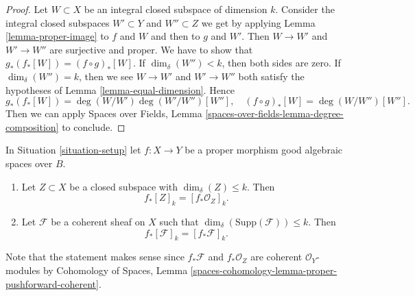 \begin{proof}
Let $W \subset X$ be an integral closed subspace of dimension $k$.
Consider the integral closed subspaces
$W' \subset Y$ and $W'' \subset Z$
we get by applying Lemma \ref{lemma-proper-image}
to $f$ and $W$ and then to $g$ and $W'$.
Then $W \to W'$ and $W' \to W''$ are surjective and proper.
We have to show that $g_*(f_*[W]) = (f \circ g)_*[W]$.
If $\dim_\delta(W'') < k$, then both sides are zero.
If $\dim_\delta(W'') = k$, then we see $W \to W'$ and $W' \to W''$
both satisfy the hypotheses of Lemma \ref{lemma-equal-dimension}.
Hence
$$
g_*(f_*[W]) = \deg(W/W')\deg(W'/W'')[W''],
\quad
(f \circ g)_*[W] = \deg(W/W'')[W''].
$$
Then we can apply
Spaces over Fields, Lemma \ref{spaces-over-fields-lemma-degree-composition}
to conclude.
\end{proof}

\begin{lemma}
\label{lemma-cycle-push-sheaf}
In Situation \ref{situation-setup} let $f : X \to Y$ be a proper morphism
good algebraic spaces over $B$.
\begin{enumerate}
\item Let $Z \subset X$ be a closed subspace with $\dim_\delta(Z) \leq k$.
Then
$$
f_*[Z]_k = [f_*{\mathcal O}_Z]_k.
$$
\item Let $\mathcal{F}$ be a coherent sheaf on $X$ such that
$\dim_\delta(\text{Supp}(\mathcal{F})) \leq k$. Then
$$
f_*[\mathcal{F}]_k = [f_*{\mathcal F}]_k.
$$
\end{enumerate}
Note that the statement makes sense since $f_*\mathcal{F}$ and
$f_*\mathcal{O}_Z$ are coherent $\mathcal{O}_Y$-modules by
Cohomology of Spaces, Lemma
\ref{spaces-cohomology-lemma-proper-pushforward-coherent}.
\end{lemma}


